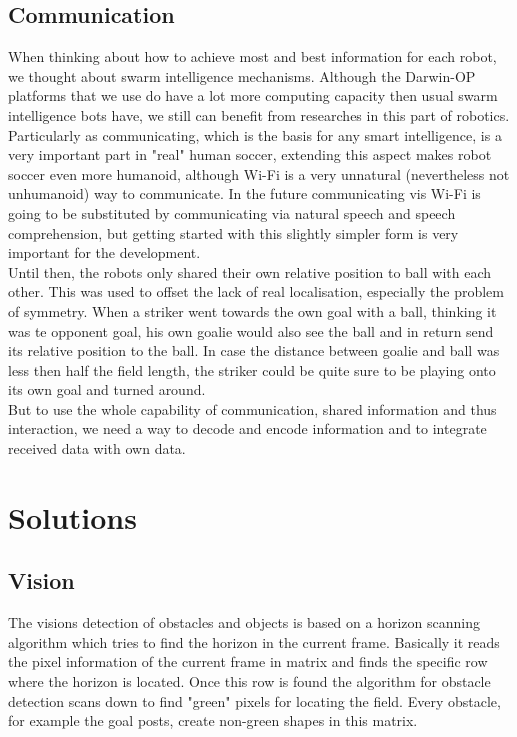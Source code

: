 \documentclass[lnicst,a4paper]{svmultln}
\begin{document}
\subsection{Communication}
\label{sec:problems_communication}
When thinking about how to achieve most and best information for each robot, we thought about swarm intelligence mechanisms. Although the Darwin-OP platforms that we use do have a lot more computing capacity then usual swarm intelligence bots have, we still can benefit from researches in this part of robotics. 
\\
Particularly as communicating, which is the basis for any smart intelligence, is a very important part in "real" human soccer, extending this aspect makes robot soccer even more humanoid, although Wi-Fi is a very unnatural (nevertheless not unhumanoid) way to communicate. In the future communicating vis Wi-Fi is going to be substituted by communicating via natural speech and speech comprehension, but getting started with this slightly simpler form is very important for the development.
\\
Until then, the robots only shared their own relative position to ball with each other. This was used to offset the lack of real localisation, especially the problem of symmetry. When a striker went towards the own goal with a ball, thinking it was te opponent goal, his own goalie would also see the ball and in return send its relative position to the ball. In case the distance between goalie and ball was less then half the field length, the striker could be quite sure to be playing onto its own goal and turned around. 
\\
But to use the whole capability of communication, shared information and thus interaction, we need a way to decode and encode information and to integrate received data with own data.





\section{Solutions}






\subsection{Vision}
\label{sec:solutions_vision}
The visions detection of obstacles and objects is based on a horizon scanning algorithm which tries to find the horizon in the current frame. Basically it reads the pixel information of the current frame in matrix and finds the specific row where the horizon is located.
Once this row is found the algorithm for obstacle detection scans down to find "green" pixels for locating the field. Every obstacle, for example the goal posts, create non-green shapes in this matrix.
\end{document}
